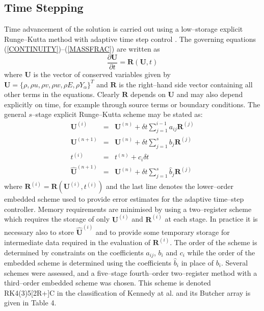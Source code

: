 \documentclass[dvips]{article}
\begin{document}
\subsection{Time Stepping}
Time advancement of the solution is carried out using a low--storage
explicit Runge--Kutta method with adaptive time step control
\cite{KennedyCarpenterLewis}.  The governing
equations (\ref{CONTINUITY})--(\ref{MASSFRAC}) are written as
\begin{equation}
\frac{\partial {\mathbf U}}{\partial t}
= {\mathbf R}({\mathbf U},t)
\label{GovEqConservRK}
\end{equation}
where ${\mathbf U}$ is the vector of conserved variables given by
${\mathbf U} = \{\rho, \rho u, \rho v, \rho w, \rho E, \rho Y_{\alpha}\}^{T}$
and ${\mathbf R}$ is the right--hand side vector containing all other terms
in the equations.  Clearly ${\mathbf R}$ depends on ${\mathbf U}$ and
may also depend explicitly on time, for example through source terms or
boundary conditions.  The general $s$--stage explicit Runge--Kutta
scheme may be stated as:
\begin{eqnarray}
{\mathbf U}^{(i)} & = & {\mathbf U}^{(n)}
                  + \delta t\sum_{j=1}^{i-1}a_{ij}{\mathbf R}^{(j)} \nonumber\\
{\mathbf U}^{(n+1)} & = & {\mathbf U}^{(n)}
                    + \delta t\sum_{j=1}^{s}b_{j}{\mathbf R}^{(j)} \nonumber\\
t^{(i)} & = &  t^{(n)} + c_{i}\delta t \nonumber \\
\hat{{\mathbf U}}^{(n+1)} & = & {\mathbf U}^{(n)}
               + \delta t\sum_{j=1}^{s}\hat{b}_{j}{\mathbf R}^{(j)}
\end{eqnarray}
where ${\mathbf R}^{(i)} = {\mathbf R}({\mathbf U}^{(i)},t^{(i)})$ and
the last line denotes the lower--order embedded scheme used to provide
error estimates for the adaptive time--step controller.  Memory
requirements are minimised by using a two--register scheme which
requires the storage of only ${\mathbf U}^{(i)}$ and ${\mathbf R}^{(i)}$ at
each stage.  In practice it is necessary also to store $\hat{\mathbf U}^{(i)}$
and to provide some temporary storage for intermediate data required in
the evaluation of ${\mathbf R}^{(i)}$.  The order of the scheme is
determined by constraints on the coefficients $a_{ij}$, $b_{i}$ and $c_{i}$
while the order of the embedded scheme is determined using the coefficients
$\hat{b}_{i}$ in place of $b_{i}$.  Several schemes were assessed, and a
five--stage
fourth--order two--register method with a third--order embedded scheme
was chosen.  This scheme is denoted RK4(3)5[2R+]C in the classification of
Kennedy at al. \cite{KennedyCarpenterLewis} and its Butcher array is
given in Table 4.
\end{document}

